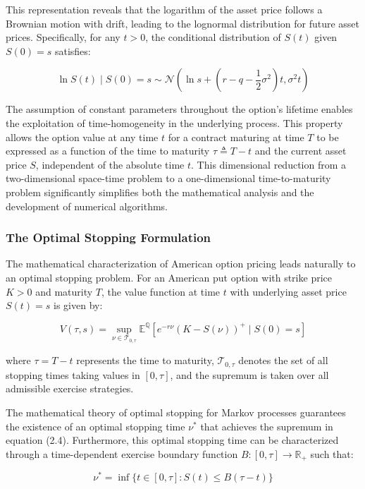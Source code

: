 \documentclass[
  11pt,
  11pt,
  letterpaper,
  onecolumn]{article}
\begin{document}
This representation reveals that the logarithm of the asset price
follows a Brownian motion with drift, leading to the lognormal
distribution for future asset prices. Specifically, for any \(t > 0\),
the conditional distribution of \(S(t)\) given \(S(0) = s\) satisfies:

\[\ln S(t) \mid S(0) = s \sim \mathcal{N}\left(\ln s + \left(r-q-\frac{1}{2}\sigma^2\right)t, \sigma^2 t\right) \tag{2.3}\]

The assumption of constant parameters throughout the option's lifetime
enables the exploitation of time-homogeneity in the underlying process.
This property allows the option value at any time \(t\) for a contract
maturing at time \(T\) to be expressed as a function of the time to
maturity \(\tau \triangleq T-t\) and the current asset price \(S\),
independent of the absolute time \(t\). This dimensional reduction from
a two-dimensional space-time problem to a one-dimensional
time-to-maturity problem significantly simplifies both the mathematical
analysis and the development of numerical algorithms.

\subsubsection{The Optimal Stopping
Formulation}\label{the-optimal-stopping-formulation}

The mathematical characterization of American option pricing leads
naturally to an optimal stopping problem. For an American put option
with strike price \(K > 0\) and maturity \(T\), the value function at
time \(t\) with underlying asset price \(S(t) = s\) is given by:

\[V(\tau,s) = \sup_{\nu \in \mathcal{T}_{0,\tau}} \mathbb{E}^{\mathbb{Q}}\left[e^{-r\nu}(K-S(\nu))^+ \mid S(0) = s\right] \tag{2.4}\]

where \(\tau = T-t\) represents the time to maturity,
\(\mathcal{T}_{0,\tau}\) denotes the set of all stopping times taking
values in \([0,\tau]\), and the supremum is taken over all admissible
exercise strategies.

The mathematical theory of optimal stopping for Markov processes
guarantees the existence of an optimal stopping time \(\nu^*\) that
achieves the supremum in equation (2.4). Furthermore, this optimal
stopping time can be characterized through a time-dependent exercise
boundary function \(B: [0,\tau] \to \mathbb{R}_+\) such that:

\[\nu^* = \inf\{t \in [0,\tau] : S(t) \leq B(\tau-t)\} \tag{2.5}\]
\end{document}
